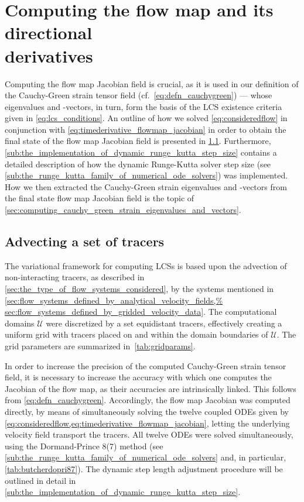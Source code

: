 \section[Computing the flow map and its directional derivatives]
{Computing the flow map and its directional\\ \phantom{3.2} derivatives}
\label{sec:computing_the_flow_map_and_its_directional_derivatives}

Computing the flow map Jacobian field is crucial, as it is used in our
definition of the Cauchy-Green strain tensor field (cf.\
\cref{eq:defn_cauchygreen}) --- whose eigenvalues and -vectors, in turn, form
the basis of the LCS existence criteria given in \cref{eq:lcs_conditions}. An
outline of how we solved \cref{eq:consideredflow} in conjunction with
\cref{eq:timederivative_flowmap_jacobian} in order to obtain the final state
of the flow map Jacobian field is presented in
\cref{sub:advecting_a_set_of_tracers}. Furthermore,
\cref{sub:the_implementation_of_dynamic_runge_kutta_step_size} contains a
detailed description of how the dynamic Runge-Kutta solver step size (see
\cref{sub:the_runge_kutta_family_of_numerical_ode_solvers}) was
implemented. How we then extracted the Cauchy-Green strain eigenvalues and
-vectors from the final state flow map Jacobian field is the topic of
\cref{sec:computing_cauchy_green_strain_eigenvalues_and_vectors}.

\subsection{Advecting a set of tracers}
\label{sub:advecting_a_set_of_tracers}

The variational framework for computing LCSs is based upon the advection of
non-interacting tracers, as described in
\cref{sec:the_type_of_flow_systems_considered}, by the systems mentioned in
\cref{sec:flow_systems_defined_by_analytical_velocity_fields,%
sec:flow_systems_defined_by_gridded_velocity_data}. The computational domains
$\mathcal{U}$ were discretized by a set equidistant tracers, effectively
creating a uniform grid with tracers placed on and within the domain boundaries
of $\mathcal{U}$. The grid parameters are summarized in~\cref{tab:gridparams}.



In order to increase the precision of the computed Cauchy-Green strain tensor
field, it is necessary to increase the accuracy with which one computes the
Jacobian of the flow map, as their accuracies are intrinsically linked.
This follows from \cref{eq:defn_cauchygreen}. Accordingly, the flow map
Jacobian was computed directly, by means of simultaneously solving the
twelve coupled ODEs given by
\cref{eq:consideredflow,eq:timederivative_flowmap_jacobian}, letting the
underlying velocity field transport the tracers. All twelve ODEs were solved
simultaneously, using the Dormand-Prince 8(7) method (see
\cref{sub:the_runge_kutta_family_of_numerical_ode_solvers} and, in particular,
\cref{tab:butcherdopri87}). The dynamic step length adjustment procedure
will be outlined in detail in
\cref{sub:the_implementation_of_dynamic_runge_kutta_step_size}.

